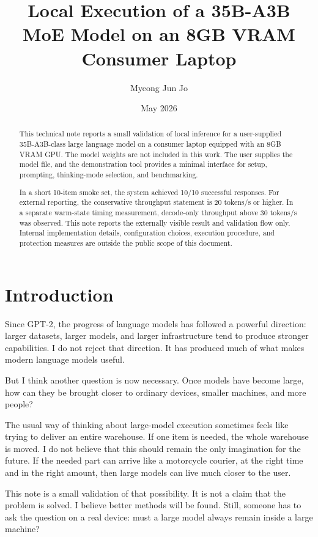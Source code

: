 \documentclass[11pt]{article}
\title{Local Execution of a 35B-A3B MoE Model on an 8GB VRAM Consumer Laptop}
\author{Myeong Jun Jo}
\date{May 2026}
\begin{document}
\maketitle

\begin{abstract}
This technical note reports a small validation of local inference for a user-supplied 35B-A3B-class large language model on a consumer laptop equipped with an 8GB VRAM GPU. The model weights are not included in this work. The user supplies the model file, and the demonstration tool provides a minimal interface for setup, prompting, thinking-mode selection, and benchmarking.

In a short 10-item smoke set, the system achieved 10/10 successful responses. For external reporting, the conservative throughput statement is 20 tokens/s or higher. In a separate warm-state timing measurement, decode-only throughput above 30 tokens/s was observed. This note reports the externally visible result and validation flow only. Internal implementation details, configuration choices, execution procedure, and protection measures are outside the public scope of this document.
\end{abstract}

\section{Introduction}

Since GPT-2, the progress of language models has followed a powerful direction: larger datasets, larger models, and larger infrastructure tend to produce stronger capabilities. I do not reject that direction. It has produced much of what makes modern language models useful.

But I think another question is now necessary. Once models have become large, how can they be brought closer to ordinary devices, smaller machines, and more people?

The usual way of thinking about large-model execution sometimes feels like trying to deliver an entire warehouse. If one item is needed, the whole warehouse is moved. I do not believe that this should remain the only imagination for the future. If the needed part can arrive like a motorcycle courier, at the right time and in the right amount, then large models can live much closer to the user.

This note is a small validation of that possibility. It is not a claim that the problem is solved. I believe better methods will be found. Still, someone has to ask the question on a real device: must a large model always remain inside a large machine?
\end{document}
